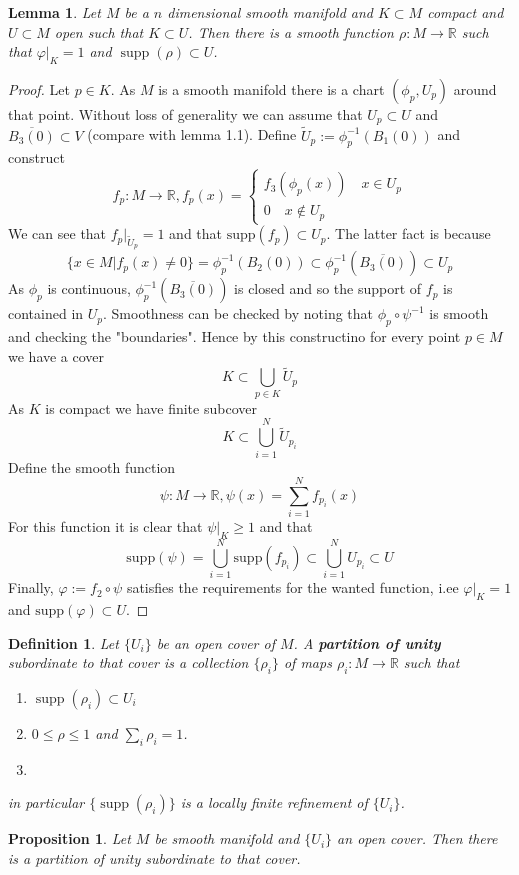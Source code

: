 \documentclass{article}
\numberwithin{theorem}{section}
\newtheorem{lemma}[theorem]{Lemma}
\newtheorem{proposition}[theorem]{Proposition}
\newtheorem{definition}[theorem]{Definition}
\newcommand{\R}{\mathbb{R}}
\newcommand{\1}{\mathds{1}}
\DeclareMathOperator{\supp}{supp}
\begin{document}
\begin{lemma}
    Let $M$ be a $n$ dimensional smooth manifold and $K\subset M$ compact and $U\subset M$ open such that $K \subset U$. Then there is a smooth function $\rho: M \to \R$ such that $\varphi|_K =1$ and $\supp(\rho) \subset U$. 
\end{lemma}
\begin{proof}
    Let $p\in K$. As $M$ is a smooth manifold there is a chart $(\phi_p,U_p )$ around that point. Without loss of generality we can assume that $U_p \subset U$ and $\overline{B_3(0)} \subset V$ (compare with lemma 1.1).
    Define $\tilde{U}_p := \phi_p^{-1}(B_1(0))$ and construct 
    \[ f_p : M \to \R, f_p(x) = \begin{cases}
        f_3(\phi_p(x)) \quad x \in U_p \\ 0 \quad x \notin U_p 
    \end{cases}\] 
    We can see that $f_p|_{\tilde{U}_p} = 1 $ and that $\text{supp}(f_p) \subset U_p$. The latter fact is because 
    \[ \{ x \in M| f_p(x) \neq 0 \} = \phi_p^{-1}(B_2(0))\subset \phi_p^{-1}(\overline{B_3(0)}) \subset U_p  \]
    As $\phi_p$ is continuous, $\phi_p^{-1}(\overline{B_3(0)})$ is closed and so the support of $f_p$ is contained in $U_p$. Smoothness can be checked by noting that $\phi_p\circ \psi^{-1}$ is smooth and checking the "boundaries". Hence by this constructino for every point $p\in M$ we have a cover 
    \[ K \subset  \bigcup_{p \in K} \tilde{U}_p \]
    As $K$ is compact we have finite subcover 
    \[ K \subset \bigcup_{i=1}^N \tilde{U}_{p_i}\]
    Define the smooth function 
    \[ \psi: M \to \R, \psi(x) = \sum_{i=1}^N  f_{p_i}(x)\]
    For this function it is clear that $\psi|_{K} \geq  1 $ and that 
    \[ \text{supp}(\psi) = \bigcup_{i=1}^N \text{supp}(f_{p_i})  \subset \bigcup_{i=1}^N U_{p_i} \subset U \]
    Finally, $\varphi := f_2\circ \psi $ satisfies the requirements for the wanted function, i.ee $\varphi|_{K} = 1$ and $\text{supp}(\varphi) \subset U$. 
\end{proof}

\begin{definition}
    Let $\{ U_i \}$ be an open cover of $M$. A \textbf{partition of unity} subordinate to that cover is a collection $\{ \rho_i \}$ of maps $\rho_i : M \to \R$ such that 
    \begin{enumerate}
        \item $\supp(\rho_i)\subset U_i $
        \item $0 \leq \rho \leq 1  $ and $\sum_i \rho_i = 1$. 
        \item 
    \end{enumerate}
    in particular  $\{ \supp(\rho_i) \}$ is a locally finite refinement of $\{ U_i \}$. 
\end{definition}
\begin{proposition}
    Let $M$ be smooth manifold and $\{ U_i \}$ an open cover. Then there is a partition of unity subordinate to that cover. 
\end{proposition}
\end{document}
